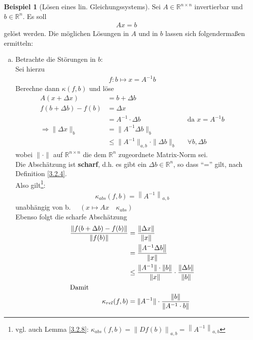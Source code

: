 \documentclass[ngerman,fontsize=11pt, paper=a4, parskip=half, titlepage=true, toc=bib]{scrbook}
\theoremstyle{definition}
\newtheorem{Bsp}[Def]{Beispiel}
\theoremstyle{plain}
\newcommand{\R}{\mathds{R}}
\newcommand{\Ren}{\mathds{R}^{n}}
\newcommand{\Renn}{\mathds{R}^{n\times n}}
\newcommand{\nn}[1]{\left\| #1 \right\|}
\newcommand{\subsectione}[1]{\subsection{#1} \addtocounter{Def}{1}}
\newenvironment{Bspe}[1][]{ %
	\begin{Bsp}[#1]
	}
	{
	\end{Bsp}
	\addtocounter{subsection}{1}
}
\begin{document}
\begin{Bspe}[Lösen eines lin. Gleichungssystems]
	\label{3.2.10}
	Sei $A\in \R^{n\times n}$ invertierbar und $b\in \R^n$. Es soll 
	\begin{gather*}
	Ax =b
	\end{gather*}
	gelöst werden.
	Die möglichen Lösungen in $A$ und in $b$ lassen sich folgendermaßen ermitteln:
	\begin{enumerate}[a)]
		\item Betrachte die Störungen in $b$:\\
		Sei hierzu
		\begin{gather*}
		f: b\mapsto x= A^{-1}b 
		\end{gather*}
		Berechne dann $ \kappa(f,b)$ und löse 
		\begin{align*}
		A(x + \Delta x) &= b+\Delta b \\
		f(b + \Delta b) - f(b) &= \Delta x \\
		&= A^{-1} \cdot \Delta b && \text{da }x = A^{-1}b \\
		\Rightarrow \|\Delta x\|_{b}  &= \|A^{-1}\Delta b\|_{b} \\
		&\leq \|A^{-1}\|_{a,b}\cdot \|\Delta b\|_{b} && \forall b, \Delta b 
		\end{align*}
		wobei $\|\cdot\| $ auf $\Renn$ die dem $\Ren$ zugeordnete Matrix-Norm sei. \\
		Die Abschätzung ist \textbf{scharf}, 
		d.h. es gibt ein $\Delta b\in \R^n$, so dass \enquote{=} gilt, 
		nach Definition \ref{3.2.4}. \\
		Also gilt\footnote{vgl. auch Lemma \ref{3.2.8}: $\kappa_{abs}(f,b)=\nn{Df(b)}_{a,b}=\nn{A^{-1}}_{a,b}$}:
		\begin{gather}
		\kappa_{abs}(f,b) = \nn{A^{-1}}_{a,b} \label{III.2.6}
		\end{gather}
		unabhängig von b.  $ \quad \left( x\mapsto Ax \quad \kappa_{abs}\right)$\\
		Ebenso folgt die scharfe Abschätzung 
		\begin{align}
		\nonumber
		\frac{\|	f(b + \Delta b) - f(b)\|}{\|f(b)\|} &= \frac{\nn{\Delta x}}{\nn{x}}\\ \nonumber
		& = \frac{\nn{A^{-1}\Delta b}}{\nn{x}} \\ \nonumber
		& \leq  \frac{\|A^{-1}\|\cdot \|b\|}{\|x\|} \cdot \frac{\|\Delta b\|}{\|b\|} \\
		\intertext{Damit}
		\kappa_{rel} (f,b) &= \|A^{-1} \| \cdot \frac{\|b\|}{\|A^{-1}\cdot b\|} \label{III.2.7}

\end{align}
\end{enumerate}
\end{Bspe}
\end{document}
